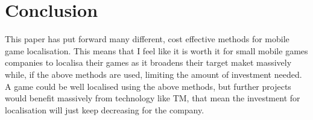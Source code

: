 \documentclass{scrartcl}
\begin{document}
\section{Conclusion}

This paper has put forward many different, cost effective methods for mobile game localisation. This means that I feel like it is worth it for small mobile games companies to localisa their games as it broadens their target maket massively while, if the above methods are used, limiting the amount of investment needed. A game could be well localised using the above methods, but further projects would benefit massively from technology like TM, that mean the investment for localisation will just keep decreasing for the company.



\end{document}
